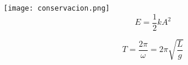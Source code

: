 \documentclass[10pt]{article}
\begin{document}
\texttt{[image: conservacion.png]}\\

\begin{equation*}
	E = \frac{1}{2}k A^2
\end{equation*}

\begin{equation}
	T = \dfrac{2\pi}{\omega} = 2\pi \sqrt{\dfrac{L}{g}}
\end{equation}
\end{document}
